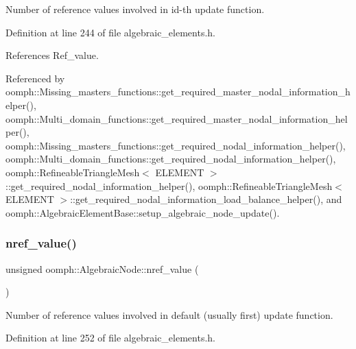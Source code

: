 Number of reference values involved in id-\/th update function. 



Definition at line 244 of file algebraic\+\_\+elements.\+h.



References Ref\+\_\+value.



Referenced by oomph\+::\+Missing\+\_\+masters\+\_\+functions\+::get\+\_\+required\+\_\+master\+\_\+nodal\+\_\+information\+\_\+helper(), oomph\+::\+Multi\+\_\+domain\+\_\+functions\+::get\+\_\+required\+\_\+master\+\_\+nodal\+\_\+information\+\_\+helper(), oomph\+::\+Missing\+\_\+masters\+\_\+functions\+::get\+\_\+required\+\_\+nodal\+\_\+information\+\_\+helper(), oomph\+::\+Multi\+\_\+domain\+\_\+functions\+::get\+\_\+required\+\_\+nodal\+\_\+information\+\_\+helper(), oomph\+::\+Refineable\+Triangle\+Mesh$<$ E\+L\+E\+M\+E\+N\+T $>$\+::get\+\_\+required\+\_\+nodal\+\_\+information\+\_\+helper(), oomph\+::\+Refineable\+Triangle\+Mesh$<$ E\+L\+E\+M\+E\+N\+T $>$\+::get\+\_\+required\+\_\+nodal\+\_\+information\+\_\+load\+\_\+balance\+\_\+helper(), and oomph\+::\+Algebraic\+Element\+Base\+::setup\+\_\+algebraic\+\_\+node\+\_\+update().

\mbox{\label{classoomph_1_1AlgebraicNode_a1d5805d44950ad5783720ba7bb5a372a}} 
\subsubsection{\texorpdfstring{nref\+\_\+value()}{nref\_value()}\hspace{0.1cm}{\footnotesize\ttfamily [2/2]}}
{\footnotesize\ttfamily unsigned oomph\+::\+Algebraic\+Node\+::nref\+\_\+value (\begin{DoxyParamCaption}{ }\end{DoxyParamCaption})\hspace{0.3cm}{\ttfamily [inline]}}



Number of reference values involved in default (usually first) update function. 



Definition at line 252 of file algebraic\+\_\+elements.\+h.



